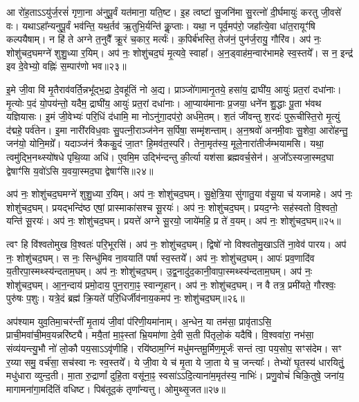 आ रो॑ह॒ताऽऽयु॑र्ज॒रसं॑ गृणा॒ना अ॑नुपू॒र्वं यत॑माना॒ यति॒ष्ट। 
इ॒ह त्वष्टा॑ सु॒जनि॑मा सु॒रत्नो॑ दी॒र्घमायुः॑ करतु जी॒वसे॑ वः। 
यथाऽहा᳚न्यनुपू॒र्वं भव॑न्ति॒ यथ॒र्तव॑ ऋ॒तुभि॒र्यन्ति॑ कॢ॒प्ताः। 
यथा॒ न पूर्व॒मप॑रो॒ जहा᳚त्ये॒वा धा॑त॒रायूꣳ॑षि कल्पयैषाम्। 
न हि॑ ते अग्ने त॒नुवै᳚ क्रू॒रं च॒कार॒ मर्त्यः॑। 
क॒पिर्ब॑भस्ति॒ तेज॑नं॒ पुन॑र्ज॒रायु॒ गौरि॑व। 
अप॑ नः॒ शोशु॑चद॒घमग्ने॑ शुशु॒ध्या र॒यिम्। 
अप॑ नः॒ शोशु॑चद॒घं मृ॒त्यवे॒ स्वाहा᳚। 
अ॒न॒ड्वाह॑म॒न्वार॑भामहे स्व॒स्तये᳚। 
स न॒ इन्द्र॑ इव दे॒वेभ्यो॒ वह्निः॑ स॒म्पार॑णो भव॥२३॥\ip

इ॒मे जी॒वा वि॑ मृ॒तैराव॑वर्ति॒न्नभू᳚द्भ॒द्रा दे॒वहू॑तिं नो अ॒द्य। 
प्राञ्जो॑गामानृ॒तये॒ हसा॑य॒ द्राघी॑य॒ आयुः॑ प्रत॒रां दधा॑नाः। 
मृ॒त्योः प॒दं यो॒पय॑न्तो॒ यदैम॒ द्राघी॑य॒ आयुः॑ प्रत॒रां दधा॑नाः। 
आ॒प्याय॑मानाः प्र॒जया॒ धने॑न शु॒द्धाः पू॒ता भ॑वथ यज्ञियासः। 
इ॒मं जी॒वेभ्यः॑ परि॒धिं द॑धामि॒ मा नोऽनु॑गा॒दप॑रो॒ अर्ध॑मे॒तम्। 
श॒तं जी॑वन्तु श॒रदः॑ पुरू॒चीस्ति॒रो मृ॒त्युं द॑द्महे॒ पर्व॑तेन। 
इ॒मा नारी॑रविध॒वाः सु॒पत्नी॒राञ्ज॑नेन स॒र्पिषा॒ सम्मृ॑शन्ताम्। 
अ॒न॒श्रवो॑ अनमी॒वाः सु॒शेवा॒ आरो॑हन्तु॒ जन॑यो॒ योनि॒मग्रे᳚। 
यदाञ्ज॑नं त्रैककु॒दं जा॒तꣳ हि॒मव॑त॒स्परि॑। 
तेना॒मृत॑स्य॒ मूले॒नारा॑तीर्जम्भयामसि। 
यथा॒ त्वमु॑द्भि॒नथ्स्यो॑षधे पृथि॒व्या अधि॑। 
ए॒वमि॒म उद्भि॑न्दन्तु की॒र्त्या यश॑सा ब्रह्मवर्च॒सेन॑। 
अ॒जो᳚ऽस्यजा॒स्मद॒घा द्वेषाꣳ॑सि य॒वो॑ऽसि य॒वया॒स्मद॒घा द्वेषाꣳ॑सि॥२४॥\ip
\anuvakamend[भ॒व॒ ज॒म्भ॒या॒म॒सि॒ त्रीणि॑ च]

अप॑ नः॒ शोशु॑चद॒घमग्ने॑ शुशु॒ध्या र॒यिम्। 
अप॑ नः॒ शोशु॑चद॒घम्। 
सु॒क्षे॒त्रि॒या सु॑गातु॒या व॑सू॒या च॑ यजामहे। 
अप॑ नः॒ शोशु॑चद॒घम्। 
प्रयद्भन्दि॑ष्ठ एषां॒ प्रास्माका॑सश्च सू॒रयः॑। 
अप॑ नः॒ शोशु॑चद॒घम्। 
प्रयद॒ग्नेः सह॑स्वतो वि॒श्वतो॒ यन्ति॑ सू॒रयः॑। 
अप॑ नः॒ शोशु॑चद॒घम्। 
प्रयत्ते॑ अग्ने सू॒रयो॒ जाये॑महि॒ प्र ते॑ व॒यम्। 
अप॑ नः॒ शोशु॑चद॒घम्॥२५॥\ip

त्वꣳ हि वि॑श्वतोमुख वि॒श्वतः॑ परि॒भूरसि॑। 
अप॑ नः॒ शोशु॑चद॒घम्। 
द्विषो॑ नो विश्वतोमु॒खाऽति॑ ना॒वेव॑ पारय। 
अप॑ नः॒ शोशु॑चद॒घम्। 
स नः॒ सिन्धु॑मिव ना॒वयाति॑ पर्\mbox{}षा स्व॒स्तये᳚। 
अप॑ नः॒ शोशु॑चद॒घम्। 
आपः॑ प्रव॒णादि॑व य॒तीरपा॒स्मथ्स्य॑न्दताम॒घम्। 
अप॑ नः॒ शोशु॑चद॒घम्। 
उ॒द्व॒नादु॑द॒कानी॒वापा॒स्मथ्स्य॑न्दताम॒घम्। 
अप॑ नः॒ शोशु॑चद॒घम्। 
आ॒न॒न्दाय॑ प्रमो॒दाय॒ पुन॒रागा॒ꣴ॒ स्वान्गृ॒हान्। 
अप॑ नः॒ शोशु॑चद॒घम्। 
न वै तत्र॒ प्रमी॑यते॒ गौरश्वः॒ पुरु॑षः प॒शुः। 
यत्रे॒दं ब्रह्म॑ क्रि॒यते॑ परि॒धिर्जीव॑नाय॒कमप॑ नः॒ शोशु॑चद॒घम्॥२६॥\ip
\anuvakamend[अ॒घम॒घं च॒त्वारि॑ च]

अप॑श्याम युव॒तिमा॒चर॑न्तीं मृ॒ताय॑ जी॒वां प॑रिणी॒यमा॑नाम्। 
अ॒न्धेन॒ या तम॑सा॒ प्रावृ॑ताऽसि॒ प्राची॒मवा॑ची॒मव॒यन्नरि॑ष्ट्यै। 
मयै॒तां मा॒ꣴ॒स्तां भ्रि॒यमा॑णा दे॒वी स॒ती पि॑तृलो॒कं यदैषि॑। 
वि॒श्ववा॑रा॒ नभ॑सा॒ संव्य॑यन्त्यु॒भौ नो॑ लो॒कौ पय॒साऽऽवृ॑णीहि। 
रयि॑ष्ठाम॒ग्निं मधु॑मन्तमू॒र्मिण॒मूर्जः॑ सन्तं त्वा॒ पय॒सोप॒ सꣳस॑देम। 
सꣳ र॒य्या समु॒ वर्च॑सा॒ सच॑स्वा नः स्व॒स्तये᳚। 
ये जी॒वा ये च॑ मृ॒ता ये जा॒ता ये च॒ जन्त्याः᳚। 
तेभ्यो॑ घृ॒तस्य॑ धारयितुं॒ मधु॑धारा व्युन्द॒ती। 
मा॒ता रु॒द्राणां᳚ दुहि॒ता वसू॑ना॒ꣴ॒ स्वसा॑ऽऽदि॒त्याना॑म॒मृत॑स्य॒ नाभिः॑। 
प्रणु॒वोचं॑ चिकि॒तुषे॒ जना॑य॒ मागामना॑गा॒मदि॑तिं वधिष्ट। 
पिब॑तूद॒कं तृणा᳚न्यत्तु। 
ओमुथ्सृ॒जत॥२७॥\ip
\anuvakamend[व॒धि॒ष्ट॒ द्वे च॑]

